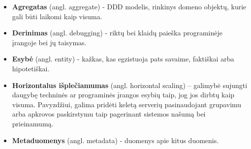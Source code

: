 \begin{itemize}

	\item \textbf{Agregatas} (angl. aggregate) - DDD modelis, rinkinys domeno objektų, kurie gali būti laikomi kaip visuma.

	\item \textbf{Derinimas} (angl. debugging) - riktų bei klaidų paieška programinėje įrangoje bei jų taisymas.

	\item \textbf{Esybė} (angl. entity) - kažkas, kas egzistuoja pats savaime, faktiškai arba hipotetiškai.

	\item \textbf{Horizontalus išplečiamumas} (angl. horizontal scaling) – galimybė sujungti daugybę techninės ar programinės įrangos esybių taip, jog jos dirbtų kaip visuma. Pavyzdžiui, galima pridėti keletą serverių pasinaudojant grupavimu arba apkrovos paskirstymu taip pagerinant sistemos našumą bei prieinamumą.

	\item \textbf{Metaduomenys} (angl. metadata) - duomenys apie kitus duomenis.

\end{itemize}
